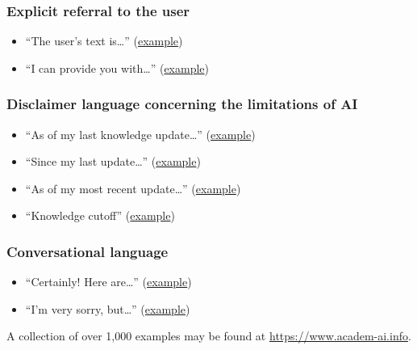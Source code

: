 \documentclass[letterpaper, 12pt]{article}
\begin{document}
\subsubsection*{Explicit referral to the user}
\begin{itemize}
    \setlength\itemsep{-0.5em}
    \item ``The user's text is\ldots'' (\href{https://pubpeer.com/publications/6928A4CF107F68CFB0116552272C0F#1}{example})
    \item ``I can provide you with\ldots'' (\href{https://pubpeer.com/publications/C5DC15FC0BF642C7042F351B98F4B6#1}{example})
\end{itemize}

\subsubsection*{Disclaimer language concerning the limitations of AI}
\begin{itemize}
    \setlength\itemsep{-0.5em}
    \item ``As of my last knowledge update\ldots'' (\href{https://pubpeer.com/publications/D09C2730217F5C4CB512F7B695C557#1}{example})
    \item ``Since my last update\ldots'' (\href{https://pubpeer.com/publications/FC3DE3B075013629DCE07FD3D8DA43#1}{example})
    \item ``As of my most recent update\ldots'' (\href{https://pubpeer.com/publications/B346C3FEAB91B258589381717CD647#1}{example})
    \item ``Knowledge cutoff'' (\href{https://pubpeer.com/publications/6C0A4E27304CDBB1A49EE9A4A64AB5#1}{example})
\end{itemize}

\subsubsection*{Conversational language}
\begin{itemize}
    \setlength\itemsep{-0.5em}
    \item ``Certainly! Here are\ldots'' (\href{https://pubpeer.com/publications/747C3973ABD5244299BFFCDD0735AF#1}{example})
    \item ``I'm very sorry, but\ldots'' (\href{https://pubpeer.com/publications/F93A8D69350BC6B12AB48B132161A7#1}{example})
\end{itemize}
%
A collection of over 1,000 examples may be found at \href{https://www.academ-ai.info}{https://www.academ-ai.info}. 
\end{document}
